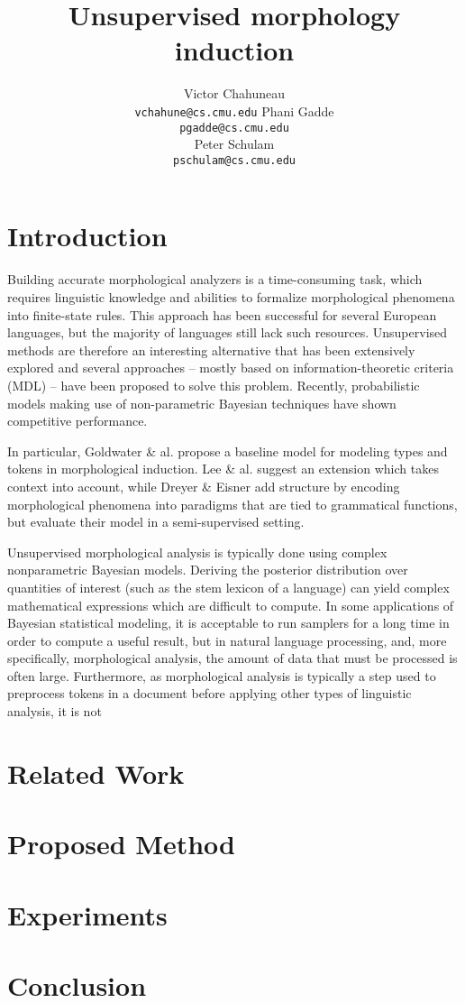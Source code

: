 \documentclass{article}
\title{Unsupervised morphology induction}
\author{
Victor Chahuneau\\
\texttt{vchahune@cs.cmu.edu}
\And
Phani Gadde\\
\texttt{pgadde@cs.cmu.edu} \\
\And
Peter Schulam\\
\texttt{pschulam@cs.cmu.edu}
}
\begin{document}
\maketitle

\section{Introduction}
\label{sec:introduction}

Building accurate morphological analyzers is a time-consuming task,
which requires linguistic knowledge and abilities to formalize
morphological phenomena into finite-state rules. This approach has
been successful for several European languages, but the majority of
languages still lack such resources. Unsupervised methods are
therefore an interesting alternative that has been extensively
explored and several approaches -- mostly based on
information-theoretic criteria (MDL) -- have been proposed to solve
this problem. Recently, probabilistic models making use of
non-parametric Bayesian techniques have shown competitive performance.

In particular, Goldwater \& al. \cite{goldwater2011} propose a
baseline model for modeling types and tokens in morphological
induction. Lee \& al. \cite{lee2011} suggest an extension which takes
context into account, while Dreyer \& Eisner \cite{dreyer2011} add
structure by encoding morphological phenomena into paradigms that are
tied to grammatical functions, but evaluate their model in a
semi-supervised setting.

Unsupervised morphological analysis is typically done using complex
nonparametric Bayesian models. Deriving the posterior distribution
over quantities of interest (such as the stem lexicon of a language)
can yield complex mathematical expressions which are difficult to
compute. In some applications of Bayesian statistical modeling, it is
acceptable to run samplers for a long time in order to compute a
useful result, but in natural language processing, and, more
specifically, morphological analysis, the amount of data that must be
processed is often large. Furthermore, as morphological analysis is
typically a step used to preprocess tokens in a document before
applying other types of linguistic analysis, it is not

\section{Related Work}
\label{sec:related-work}

\section{Proposed Method}
\label{sec:proposed-method}

\section{Experiments}
\label{sec:experiments}

\section{Conclusion}
\label{sec:conclusion}



\end{document}
